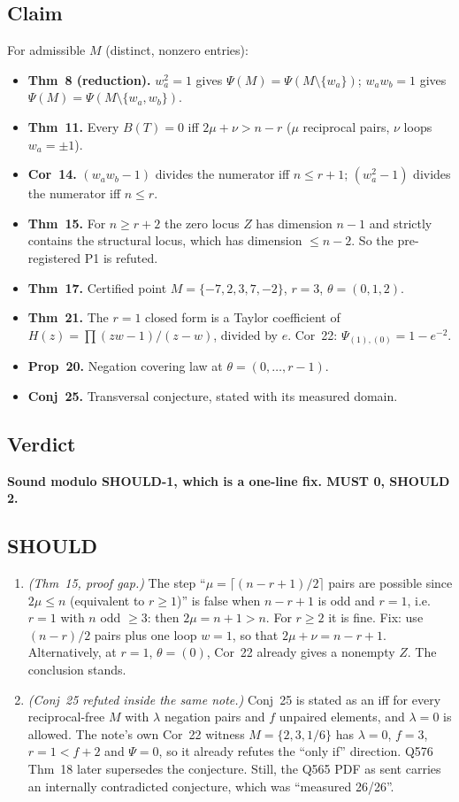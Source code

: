 \documentclass[11pt]{amsart}
\begin{document}
\subsection*{Claim}
For admissible $M$ (distinct, nonzero entries):
\begin{itemize}[leftmargin=2em]
\item \textbf{Thm~8 (reduction).} $w_a^2=1$ gives $\Psi(M)=\Psi(M\setminus\{w_a\})$;
$w_aw_b=1$ gives $\Psi(M)=\Psi(M\setminus\{w_a,w_b\})$.
\item \textbf{Thm~11.} Every $B(T)=0$ iff $2\mu+\nu>n-r$ ($\mu$ reciprocal pairs, $\nu$ loops
$w_a=\pm1$).
\item \textbf{Cor~14.} $(w_aw_b-1)$ divides the numerator iff $n\le r+1$; $(w_a^2-1)$ divides the
numerator iff $n\le r$.
\item \textbf{Thm~15.} For $n\ge r+2$ the zero locus $Z$ has dimension $n-1$ and strictly contains
the structural locus, which has dimension $\le n-2$. So the pre-registered P1 is refuted.
\item \textbf{Thm~17.} Certified point $M=\{-7,2,3,7,-2\}$, $r=3$, $\theta=(0,1,2)$.
\item \textbf{Thm~21.} The $r=1$ closed form is a Taylor coefficient of
$H(z)=\prod(zw-1)/(z-w)$, divided by $e$. Cor~22: $\Psi_{(1),(0)}=1-e^{-2}$.
\item \textbf{Prop~20.} Negation covering law at $\theta=(0,\dots,r-1)$.
\item \textbf{Conj~25.} Transversal conjecture, stated with its measured domain.
\end{itemize}

\subsection*{Verdict}
\textbf{Sound modulo SHOULD-1, which is a one-line fix. MUST 0, SHOULD 2.}

\subsection*{SHOULD}
\begin{enumerate}[leftmargin=2em,label=\textbf{SHOULD-\arabic*.}]
\item \emph{(Thm~15, proof gap.)} The step ``$\mu=\lceil(n-r+1)/2\rceil$ pairs are possible since
$2\mu\le n$ (equivalent to $r\ge1$)'' is false when $n-r+1$ is odd and $r=1$, i.e.\ $r=1$ with
$n$ odd $\ge3$: then $2\mu=n+1>n$. For $r\ge2$ it is fine. Fix: use $(n-r)/2$ pairs plus one loop
$w=1$, so that $2\mu+\nu=n-r+1$. Alternatively, at $r=1$, $\theta=(0)$, Cor~22 already gives a
nonempty $Z$. The conclusion stands.
\item \emph{(Conj~25 refuted inside the same note.)} Conj~25 is stated as an iff for every
reciprocal-free $M$ with $\lambda$ negation pairs and $f$ unpaired elements, and $\lambda=0$ is
allowed. The note's own Cor~22 witness $M=\{2,3,1/6\}$ has $\lambda=0$, $f=3$, $r=1<f+2$ and
$\Psi=0$, so it already refutes the ``only if'' direction. Q576 Thm~18 later supersedes the
conjecture. Still, the Q565 PDF as sent carries an internally contradicted conjecture, which was
``measured 26/26''.
\end{enumerate}
\end{document}
